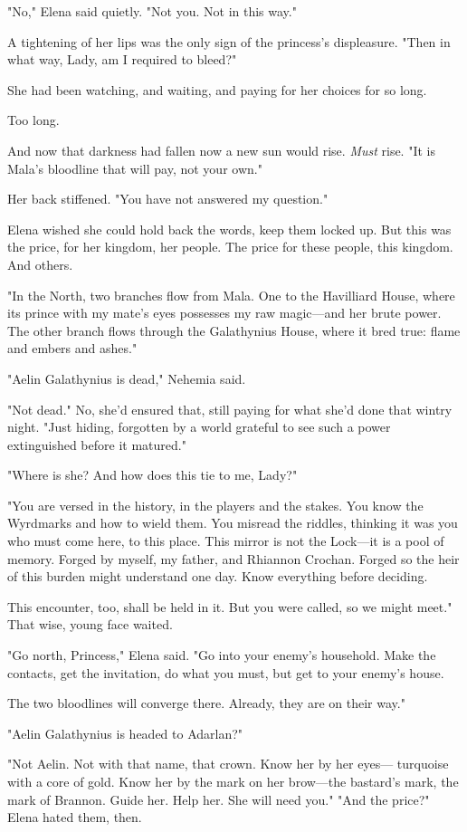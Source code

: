 "No," Elena said quietly. "Not you. Not in this way."

A tightening of her lips was the only sign of the princess's displeasure. "Then in what way, Lady, am I required to bleed?"

She had been watching, and waiting, and paying for her choices for so long.

Too long.

And now that darkness had fallen  now a new sun would rise.
\emph{Must} rise. "It is Mala's bloodline that will pay, not your own."

Her back stiffened. "You have not answered my question."

Elena wished she could hold back the words, keep them locked up. But this was the price, for her kingdom, her people. The price for these people, this kingdom. And others.

"In the North, two branches flow from Mala. One to the Havilliard House, where its prince with my mate's eyes possesses my raw magic---and her brute power. The other branch flows through the Galathynius House, where it bred true: flame and embers and ashes."

"Aelin Galathynius is dead," Nehemia said.

"Not dead." No, she'd ensured that, still paying for what she'd done that wintry night. "Just hiding, forgotten by a world grateful to see such a power extinguished before it matured."

"Where is she? And how does this tie to me, Lady?"

"You are versed in the history, in the players and the stakes. You know the Wyrdmarks and how to wield them. You misread the riddles, thinking it was you who must come here, to this place. This mirror is not the Lock---it is a pool of memory. Forged by myself, my father, and Rhiannon Crochan. Forged so the heir of this burden might understand one day. Know everything before deciding.

This encounter, too, shall be held in it. But you were called, so we might meet." That wise, young face waited.

"Go north, Princess," Elena said. "Go into your enemy's household. Make the contacts, get the invitation, do what you must, but get to your enemy's house.

The two bloodlines will converge there. Already, they are on their way."

"Aelin Galathynius is headed to Adarlan?"

"Not Aelin. Not with that name, that crown. Know her by her eyes--- turquoise with a core of gold. Know her by the mark on her brow---the bastard's mark, the mark of Brannon. Guide her. Help her. She will need you." "And the price?" Elena hated them, then.

